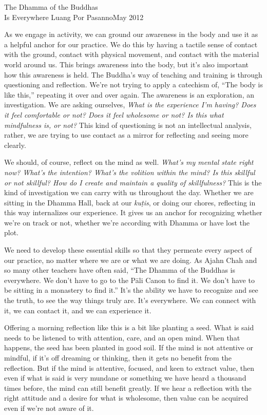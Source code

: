 {The Dhamma of the Buddhas\\Is Everywhere}
{Luang Por Pasanno}{May 2012}

As we engage in activity, we can ground our awareness in the body and 
use it as a helpful anchor for our practice. We do this by having a 
tactile sense of contact with the ground, contact with physical 
movement, and contact with the material world around us. This brings 
awareness into the body, but it's also important how this awareness is 
held. The Buddha's way of teaching and training is through questioning 
and reflection. We're not trying to apply a catechism of, ``The body is 
like this,'' repeating it over and over again. The awareness is an 
exploration, an investigation. We are asking ourselves, \emph{What is 
the experience I'm having? Does it feel comfortable or not? Does it 
feel wholesome or not? Is this what mindfulness is, or not?} This kind 
of questioning is not an intellectual analysis, rather, we are trying 
to use contact as a mirror for reflecting and seeing more clearly.

We should, of course, reflect on the mind as well. \emph{What's my 
mental state right now? What's the intention? What's the volition 
within the mind? Is this skillful or not skillful? How do I create and 
maintain a quality of skillfulness?} This is the kind of investigation 
we can carry with us throughout the day. Whether we are sitting in the 
Dhamma Hall, back at our \emph{kuṭis}, or doing our chores, 
reflecting in this way internalizes our experience. It gives us an 
anchor for recognizing whether we're on track or not, whether we're 
according with Dhamma or have lost the plot.

We need to develop these essential skills so that they permeate every 
aspect of our practice, no matter where we are or what we are doing. As 
Ajahn Chah and so many other teachers have often said, ``The Dhamma of 
the Buddhas is everywhere. We don't have to go to the Pāli Canon to 
find it. We don't have to be sitting in a monastery to find it.'' It's 
the ability we have to recognize and see the truth, to see the way 
things truly are. It's everywhere. We can connect with it, we can 
contact it, and we can experience it.


Offering a morning reflection like this is a bit like planting a seed. 
What is said needs to be listened to with attention, care, and an open 
mind. When that happens, the seed has been planted in good soil. If the 
mind is not attentive or mindful, if it's off dreaming or thinking, 
then it gets no benefit from the reflection. But if the mind is 
attentive, focused, and keen to extract value, then even if what is 
said is very mundane or something we have heard a thousand times 
before, the mind can still benefit greatly. If we hear a reflection 
with the right attitude and a desire for what is wholesome, then value 
can be acquired even if we're not aware of it.

